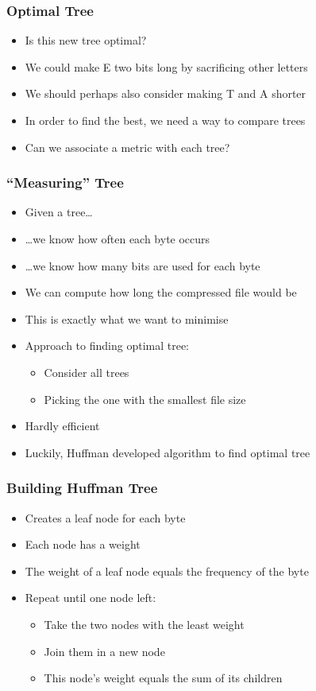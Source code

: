 \documentclass{../ucll-slides}
\begin{document}
\begin{frame}
  \frametitle{Optimal Tree}
  \begin{itemize}
    \item Is this new tree optimal?
    \item We could make E two bits long by sacrificing other letters
    \item We should perhaps also consider making T and A shorter
    \item In order to find the best, we need a way to compare trees
    \item Can we associate a metric with each tree?
  \end{itemize}
\end{frame}

\begin{frame}
  \frametitle{``Measuring'' Tree}
  \begin{itemize}
    \item Given a tree\dots
    \item \dots we know how often each byte occurs
    \item \dots we know how many bits are used for each byte
    \item We can compute how long the compressed file would be
    \item This is exactly what we want to minimise
    \item Approach to finding optimal tree:
          \begin{itemize}
            \item Consider all trees
            \item Picking the one with the smallest file size
          \end{itemize}
    \item Hardly efficient
    \item Luckily, Huffman developed algorithm to find optimal tree
  \end{itemize}
\end{frame}

\begin{frame}
  \frametitle{Building Huffman Tree}
  \begin{itemize}
    \item Creates a leaf node for each byte
    \item Each node has a weight
    \item The weight of a leaf node equals the frequency of the byte
    \item Repeat until one node left:
          \begin{itemize}
            \item Take the two nodes with the least weight
            \item Join them in a new node
            \item This node's weight equals the sum of its children
          \end{itemize}
  \end{itemize}
\end{frame}
\end{document}
